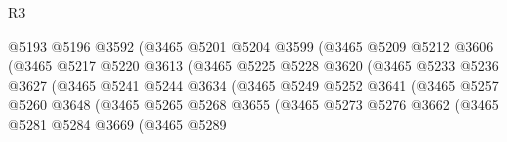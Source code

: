 \begin{lexlean}{R3}
\begin{coremodule}
                                    @5193
                                    @5196
                                    @3592
                                    (@3465
                                      @5201
                                      @5204
                                      @3599
                                      (@3465
                                        @5209
                                        @5212
                                        @3606
                                        (@3465
                                          @5217
                                          @5220
                                          @3613
                                          (@3465
                                            @5225
                                            @5228
                                            @3620
                                            (@3465
                                              @5233
                                              @5236
                                              @3627
                                              (@3465
                                                @5241
                                                @5244
                                                @3634
                                                (@3465
                                                  @5249
                                                  @5252
                                                  @3641
                                                  (@3465
                                                    @5257
                                                    @5260
                                                    @3648
                                                    (@3465
                                                      @5265
                                                      @5268
                                                      @3655
                                                      (@3465
                                                        @5273
                                                        @5276
                                                        @3662
                                                        (@3465
                                                          @5281
                                                          @5284
                                                          @3669
                                                          (@3465
                                                            @5289

\end{coremodule}
\end{lexlean}
